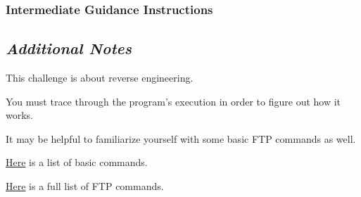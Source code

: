 {{        \subsubsection{Intermediate Guidance Instructions}







            {\parindent0pt\singlespacing







                \subsection*{\textit{Additional Notes}}







                    This challenge is about reverse engineering. %







You must trace through the program's execution in order to figure out how it works. %







It may be helpful to familiarize yourself with some basic FTP commands as well. 















                    \href{https://kb.iu.edu/d/aenq}{Here} is a list of basic commands.















                    \href{https://en.wikipedia.org/wiki/List_of_FTP_commands}{Here} is a full list of FTP commands.















}}}
